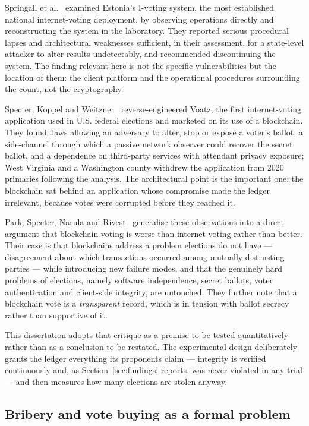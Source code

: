 Springall et al.~\cite{springall2014} examined Estonia's I-voting
system, the most established national internet-voting deployment, by
observing operations directly and reconstructing the system in the
laboratory. They reported serious procedural lapses and architectural
weaknesses sufficient, in their assessment, for a state-level attacker
to alter results undetectably, and recommended discontinuing the
system. The finding relevant here is not the specific vulnerabilities
but the location of them: the client platform and the operational
procedures surrounding the count, not the cryptography.

Specter, Koppel and Weitzner~\cite{specter2020} reverse-engineered
Voatz, the first internet-voting application used in U.S. federal
elections and marketed on its use of a blockchain. They found flaws
allowing an adversary to alter, stop or expose a voter's ballot, a
side-channel through which a passive network observer could recover the
secret ballot, and a dependence on third-party services with attendant
privacy exposure; West Virginia and a Washington county withdrew the
application from 2020 primaries following the analysis. The
architectural point is the important one: the blockchain sat behind an
application whose compromise made the ledger irrelevant, because votes
were corrupted before they reached it.

Park, Specter, Narula and Rivest~\cite{park2021} generalise these
observations into a direct argument that blockchain voting is worse
than internet voting rather than better. Their case is that blockchains
address a problem elections do not have --- disagreement about which
transactions occurred among mutually distrusting parties --- while
introducing new failure modes, and that the genuinely hard problems of
elections, namely software independence, secret ballots, voter
authentication and client-side integrity, are untouched. They further
note that a blockchain vote is a \emph{transparent} record, which is in
tension with ballot secrecy rather than supportive of it.

This dissertation adopts that critique as a premise to be tested
quantitatively rather than as a conclusion to be restated. The
experimental design deliberately grants the ledger everything its
proponents claim --- integrity is verified continuously and, as
Section~\ref{sec:findings} reports, was never violated in any trial ---
and then measures how many elections are stolen anyway.

\subsection{Bribery and vote buying as a formal problem}
\label{sec:lit-bribery}

